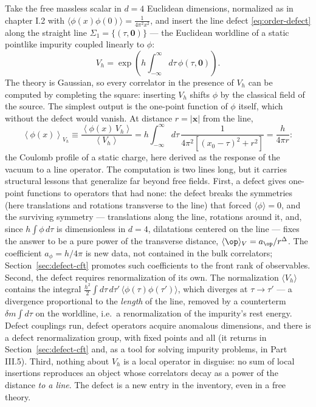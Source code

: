 \begin{eexample}
\label{ex:static-impurity}
Take the free massless scalar in $d = 4$ Euclidean dimensions,
normalized as in chapter I.2 with
$\langle\phi(x)\phi(0)\rangle = \frac{1}{4\pi^2 x^2}$, and insert the
line defect \eqref{eq:order-defect} along the straight line
$\Sigma_1 = \{(\tau, \mathbf{0})\}$ --- the Euclidean worldline of a
static pointlike impurity coupled linearly to $\phi$:
\begin{equation}
V_h = \exp\left( h \int_{-\infty}^{\infty} d\tau\, \phi(\tau, \mathbf{0})\right).
\end{equation}
The theory is Gaussian, so every correlator in the presence of $V_h$ can
be computed by completing the square: inserting $V_h$ shifts $\phi$ by
the classical field of the source. The simplest output is the one-point
function of $\phi$ itself, which without the defect would vanish.
At distance $r = |\mathbf{x}|$ from the line,
\begin{equation}
\left\langle \phi(x) \right\rangle_{V_h}
\equiv \frac{\left\langle \phi(x)\, V_h \right\rangle}{\left\langle V_h \right\rangle}
= h \int_{-\infty}^{\infty} d\tau\,
\frac{1}{4\pi^2\left[(x_0-\tau)^2 + r^2\right]}
= \frac{h}{4\pi r}:
\label{eq:impurity-onepoint}
\end{equation}
the Coulomb profile of a static charge, here derived as the response of
the vacuum to a line operator. The computation is two lines long, but
it carries structural lessons that generalize far beyond free fields.
First, a defect gives one-point functions to operators that had none:
the defect breaks the symmetries (here translations and rotations
transverse to the line) that forced $\langle\phi\rangle = 0$, and the
surviving symmetry --- translations along the line, rotations around it,
and, since $h\int\phi\, d\tau$ is dimensionless in $d=4$, dilatations
centered on the line --- fixes the answer to be a pure power of the
transverse distance, $\langle\op\rangle_V = a_{\op}/r^{\Delta}$. The
coefficient $a_\phi = h/4\pi$ is new data, not contained in the bulk
correlators; Section~\ref{sec:defect-cft} promotes such coefficients to
the front rank of observables. Second, the defect requires
renormalization of its own. The normalization $\langle V_h\rangle$
contains the integral $\frac{h^2}{2}\int d\tau\, d\tau'\,
\langle\phi(\tau)\phi(\tau')\rangle$, which diverges at $\tau \to \tau'$
--- a divergence proportional to the \emph{length} of the line, removed
by a counterterm $\delta m \int d\tau$ on the worldline, i.e.\ a
renormalization of the impurity's rest energy. Defect couplings run,
defect operators acquire anomalous dimensions, and there is a defect
renormalization group, with fixed points and all (it returns in
Section~\ref{sec:defect-cft} and, as a tool for solving impurity
problems, in Part III.5). Third, nothing about $V_h$ is a local operator
in disguise: no sum of local insertions reproduces an object whose
correlators decay as a power of the distance \emph{to a line}. The
defect is a new entry in the inventory, even in a free theory.
\end{eexample}

